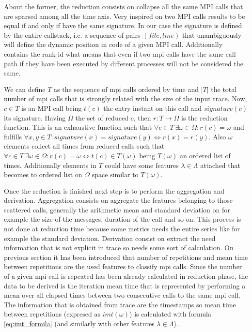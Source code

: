 About the former, the reduction consists on collapse all the same MPI calls that
are sparsed among all the time axis. Very inspired on \cite{noeth2009scalatrace}
two MPI calls
results to be equal if and only if have the same signature. In our case the
signature is defined by the entire callstack, i.e. a sequence of pairs 
$(file, line)$ that unambiguously will define the dynamic position in code of a
given MPI call. Additionally contains the rank-id what means that even if two
mpi calls have the same call path if they have been executed by different
processes will not be considered the same.

We can define $T$ as the sequence of mpi calls ordered by time and $|T|$ the 
total number of mpi calls that is strongly related with the size of the input trace. 
Now, $c \in T$ is an MPI call being $t(c)$ the entry instant on this call and 
$signature(c)$ its signature. Having 
$\Omega$ the set of reduced $c$, then $r:T\rightarrow\Omega$ is the reduction 
function. This is an exhaustive function such that $\forall c \in T \medspace \exists 
\omega \in \Omega : r(c)=\omega$ and fulfills $\forall x,y \in T : 
signature(x)=signature(y) \Leftrightarrow r(x)=r(y)$. Also $\omega$ elements
collect all times from reduced calls such that $\forall c \in T \medspace
\exists \omega \in \Omega : r(c)=\omega \Leftrightarrow t(c) \in T(\omega)$
being $T(\omega)$ an ordered list of times. Additionally elements in $T$ could 
have some features $\lambda \in \Lambda$ attached that becomes to ordered list 
on $\Omega$ space similar to $T(\omega)$. 

Once the reduction is finished next step is to perform the aggregation and
derivation. Aggregation consists on aggregate the features
belonging to those scattered calls, generally the arithmetic mean and standard
deviation on for example the size of the messages, duration of the call 
and so on. This process is not
done at reduction time because some metrics needs the entire series like
for example the standard deviation. Derivation 
consist on extract the need information that is not
explicit in trace so needs some sort of calculation. On previous section 
it has been introduced that number of repetitions and
mean time between repetitions are the used features to classify mpi calls. Since the
number of a given mpi call is repeated has been already calculated in reduction phase, the
data to be derived is the iteration mean time that is represented by performing
a mean over all elapsed times between two consecutive calls to the same mpi call.
The information that is obtained from trace are the timestamps so mean
time between repetitions (expresed as $imt(\omega)$) is calculated with formula 
\ref{eq:imt_formila} (and similarly with other features $\lambda \in \Lambda$).

